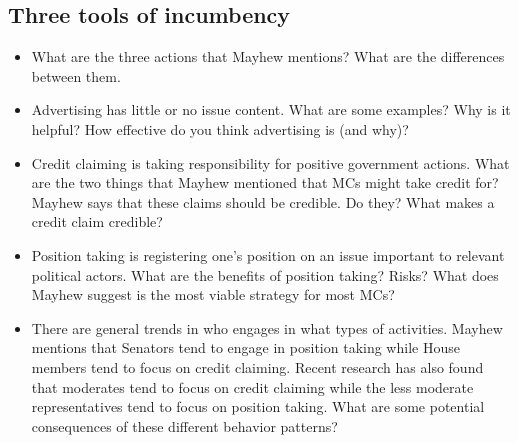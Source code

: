 \documentclass[10pt]{article}
\begin{document}
\subsection{Three tools of incumbency}
\begin{itemize}
    \item What are the three actions that Mayhew mentions? What are the differences between them.
    \item Advertising has little or no issue content. What are some examples? Why is it helpful? How effective do you think advertising is (and why)? 
    \item Credit claiming is taking responsibility for positive government actions. What are the two things that Mayhew mentioned that MCs might take credit for? Mayhew says that these claims should be credible. Do they? What makes a credit claim credible? 
    \item Position taking is registering one's position on an issue important to relevant political actors. What are the benefits of position taking? Risks? What does Mayhew suggest is the most viable strategy for most MCs?
    \item There are general trends in who engages in what types of activities. Mayhew mentions that Senators tend to engage in position taking while House members tend to focus on credit claiming. Recent research has also found that moderates tend to focus on credit claiming while the less moderate representatives tend to focus on position taking. What are some potential consequences of these different behavior patterns? 
\end{itemize}
\end{document}
